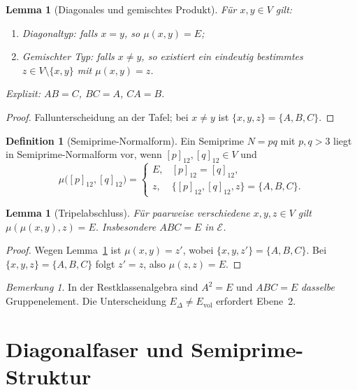 \documentclass[11pt,a4paper]{article}
\newtheorem{lemma}[theorem]{Lemma}
\theoremstyle{definition}
\newtheorem{definition}[theorem]{Definition}
\theoremstyle{remark}
\newtheorem{remark}[theorem]{Bemerkung}
\newcommand{\E}{\mathcal{E}}
\newcommand{\Evol}{E_{\mathrm{vol}}}
\newcommand{\EDelta}{E_{\Delta}}
\begin{document}
	\begin{lemma}[Diagonales und gemischtes Produkt]
		\label{lem:diag-mixed}
		Für $x,y\in V$ gilt:
		\begin{enumerate}
			\item \emph{Diagonaltyp:} falls $x=y$, so $\mu(x,y)=E$;
			\item \emph{Gemischter Typ:} falls $x\neq y$, so existiert ein eindeutig
			bestimmtes $z\in V\setminus\{x,y\}$ mit $\mu(x,y)=z$.
		\end{enumerate}
		Explizit: $AB=C$, $BC=A$, $CA=B$.
	\end{lemma}
	
	\begin{proof}
		Fallunterscheidung an der Tafel; bei $x\neq y$ ist
		$\{x,y,z\}=\{A,B,C\}$.
	\end{proof}
	
	\begin{definition}[Semiprime-Normalform]
		\label{def:semiprime-nf}
		Ein Semiprime $N=pq$ mit $p,q>3$ liegt in Semiprime-Normalform vor, wenn
		$[p]_{12},[q]_{12}\in V$ und
		\[
		\mu\bigl([p]_{12},[q]_{12}\bigr)
		=
		\begin{cases}
			E, & [p]_{12}=[q]_{12},\\
			z, & \{[p]_{12},[q]_{12},z\}=\{A,B,C\}.
		\end{cases}
		\]
	\end{definition}
	
	\begin{lemma}[Tripelabschluss]
		\label{lem:ABC}
		Für paarweise verschiedene $x,y,z\in V$ gilt
		$\mu(\mu(x,y),z)=E$. Insbesondere $ABC=E$ in $\E$.
	\end{lemma}
	
	\begin{proof}
		Wegen Lemma~\ref{lem:diag-mixed} ist $\mu(x,y)=z'$, wobei $\{x,y,z'\}=\{A,B,C\}$.
		Bei $\{x,y,z\}=\{A,B,C\}$ folgt $z'=z$, also $\mu(z,z)=E$.
	\end{proof}
	
	\begin{remark}
		\label{rem:same-E}
		In der Restklassenalgebra sind $A^2=E$ und $ABC=E$ \emph{dasselbe}
		Gruppenelement. Die Unterscheidung $\EDelta\neq\Evol$ erfordert Ebene~2.
	\end{remark}
	
	\section{Diagonalfaser und Semiprime-Struktur}
	\label{sec:fiber}
	
\end{document}
